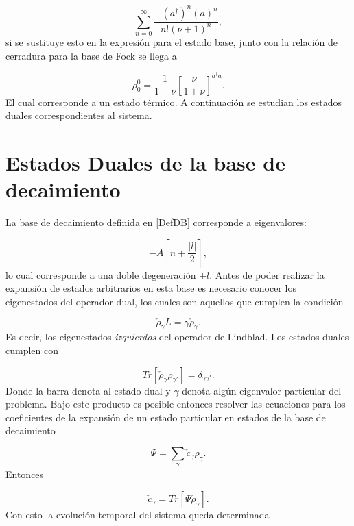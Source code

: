 \documentclass[a4paper,10pt]{report}
\begin{document}
\begin{equation}
\sum_{n=0}^\infty \frac{-(a^\dagger)^n (a)^n}{n!(\nu+1)^n},
\end{equation} si se sustituye esto en la expresión para el estado base, junto con la relación de cerradura para la base de Fock se llega a \cite{EnglertDB}

\begin{equation}
\rho_0^0 = \frac{1}{1+\nu} [\frac{\nu}{1+\nu}]^{a^\dagger a}.
\end{equation}El cual corresponde a un estado térmico\cite{EnglertDB}. A continuación se estudian los estados duales correspondientes al sistema.

\section{Estados Duales de la base de decaimiento}

La base de decaimiento \cite{EnglertDB} definida en \ref{DefDB} corresponde a eigenvalores:

\begin{equation}
 -A[n+\frac{|l|}{2}],
\end{equation}lo cual corresponde a una doble degeneración $\pm l$. Antes de poder realizar la expansión de estados arbitrarios en esta base es necesario conocer los eigenestados del operador dual, los cuales son aquellos que cumplen la condición\cite{EnglertDB}

\begin{equation}
\check{\rho}_\gamma L = \gamma\check{\rho}_\gamma.
\end{equation} Es decir, los eigenestados \textit{izquierdos} del operador de Lindblad. Los estados duales cumplen con

\begin{equation}
Tr[\check{\rho}_{\gamma}\rho_{\gamma'}] = \delta_{\gamma\gamma'}.
\end{equation} Donde la barra denota al estado dual y $\gamma$ denota algún eigenvalor particular del problema. Bajo este producto es posible entonces resolver las ecuaciones para los coeficientes de la expansión de un estado particular en estados de la base de decaimiento

\begin{equation}
\Psi = \sum_{\gamma}\check{c}_\gamma \rho_\gamma.
\end{equation} Entonces

\begin{equation}
\check{c}_\gamma = Tr[\Psi\check{\rho}_{\gamma}].
\end{equation} Con esto la evolución temporal del sistema queda determinada
\end{document}
